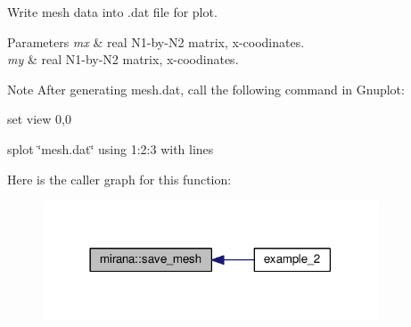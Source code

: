 Write mesh data into .dat file for plot. 


\begin{DoxyParams}{Parameters}
{\em mx} & real N1-\/by-\/\+N2 matrix, x-\/coodinates. \\
\hline
{\em my} & real N1-\/by-\/\+N2 matrix, x-\/coodinates. \\
\hline
\end{DoxyParams}
\begin{DoxyNote}{Note}
After generating mesh.\+dat, call the following command in Gnuplot\+:
\begin{DoxyItemize}
\item set view 0,0
\item splot \char`\"{}mesh.\+dat\char`\"{} using 1\+:2\+:3 with lines 
\end{DoxyItemize}
\end{DoxyNote}


Here is the caller graph for this function\+:\nopagebreak
\begin{figure}[H]
\begin{center}
\leavevmode
\includegraphics[width=282pt]{namespacemirana_a9cbee1a318e5e828590c9ccaa51c8472_icgraph}
\end{center}
\end{figure}


